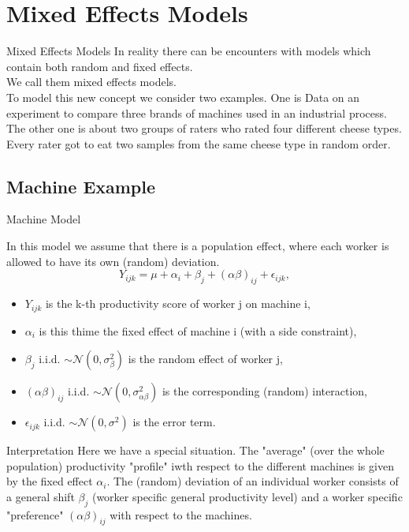 \documentclass[unknownkeysallowed]{beamer}
\begin{document}
\section{Mixed Effects Models}
\begin{frame}{Mixed Effects Models}
	In reality there can be encounters with models which contain both random and fixed effects. \\ We call them mixed effects models.\\
	To model this new concept we consider two examples. One is Data on an experiment to compare three brands of machines used in an industrial process. The other one is about two groups of raters who rated four different cheese types. Every rater got to eat two samples from the same cheese type in random order.
\end{frame}
\subsection{Machine Example}
\begin{frame}{Machine Model}
	
	In this model we assume that there is a population effect, where each worker is allowed to have its own (random) deviation.
	\begin{equation*}
		Y_{ijk} = \mu + \alpha_i + \beta_j + (\alpha \beta)_{ij} + \epsilon_{ijk},
	\end{equation*}
	
	\begin{itemize}
		\item $Y_{ijk}$ is the k-th productivity score of worker j on machine i,
		\item $\alpha_i$ is this thime the fixed effect of machine i (with a side constraint),
		\item $\beta_j$ i.i.d. $\sim \mathcal{N}(0,\sigma^2_{\beta})$ is the random effect of worker j,
		\item $(\alpha \beta)_{ij}$ i.i.d. $\sim \mathcal{N}(0,\sigma^2_{\alpha \beta})$ is the corresponding (random) interaction,
		\item $\epsilon_{ijk}$ i.i.d. $\sim \mathcal{N}(0,\sigma^2)$ is the error term.
	\end{itemize}
	

\end{frame}

\begin{frame}{Interpretation}
	Here we have a special situation. The "average" (over the whole population) productivity "profile" iwth respect to the different machines is given by the fixed effect $\alpha_i$. The (random) deviation of an individual worker consists of a general shift $\beta_j$ (worker specific general productivity level) and a worker specific "preference" $(\alpha \beta)_{ij}$ with respect to the machines.
\end{frame}
\end{document}

